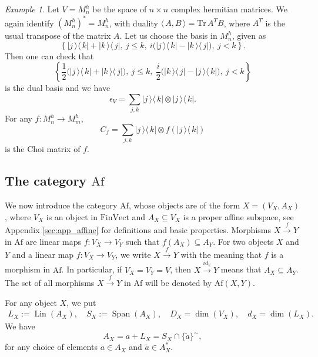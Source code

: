 \documentclass[12pt]{article}
\theoremstyle{definition}
\theoremstyle{remark}
\newtheorem{exm}{Example}
\def\lin{\operatorname{Lin}}
\def\Span{\operatorname{Span}}
\def \Tr{\mathrm{Tr}\,}
\def\<{\langle\,}
\def\>{\,\rangle}
\def \Af{\mathrm{Af}}
\def \FV{\mathrm{FinVect}}
\begin{document}
\begin{exm}\label{exm:quantum} Let $V=M_n^h$ be the space of $n\times n$ complex hermitian matrices. We again
identify $(M_n^h)^*=M_n^h$, with duality $\<A,B\>=\Tr A^TB$, where $A^T$ is the usual
transpose of the matrix $A$. Let us choose the basis in $M_n^h$, given as
\[
\left\{|j\>\<k|+|k\>\<j|,\ j\le k,\ i\biggl(|j\>\<k|-|k\>\<j|\biggr),\ j<k\right\}.
\]
Then one can check that
\[
\left\{\frac12\biggl(|j\>\<k|+|k\>\<j|\biggl),\ j\le k,\
\frac{i}{2}\biggl(|k\>\<j|-|j\>\<k|\biggr),\ j<k\right\}
\]
is the dual basis and we have
\[
\epsilon_V=\sum_{j,k} |j\>\<k|\otimes |j\>\<k|.
\]
For any $f:M_n^h\to M_m^h$, 
\[
C_f=\sum_{j,k} |j\>\<k|\otimes f(|j\>\<k|)
\]
is the Choi matrix of $f$.

\end{exm}





\subsection{The category $\Af$}

We now introduce the category $\Af$, whose objects  are of the form $X=(V_X,A_X)$, where
$V_X$ is an object in $\FV$  and $A_X\subseteq V_X$ is a proper affine subspace, see Appendix
\ref{sec:app_affine} for definitions and basic properties. Morphisms $X\xrightarrow{f} Y$ in $\Af$ are linear maps $f:V_X\to V_Y$  such that
$f(A_X)\subseteq A_Y$. For two objects $X$ and $Y$ and a  linear map $f:V_X\to V_Y$, we write $X\xrightarrow{f} Y$ with
the meaning that $f$ is a morphism in $\Af$. In particular, if $V_X=V_Y=V$, then  $X\xrightarrow{id_V} Y$ means
that  $A_X\subseteq A_Y$. The set of all morphisms $X\xrightarrow{f} Y$ in $\Af$ will be
denoted by $\Af(X,Y)$.


For any object $X$, we put
\begin{align*}
L_X:=\lin(A_X), \quad  S_X:=\Span(A_X), \quad D_X=\dim(V_X),\quad d_X=\dim(L_X).
\end{align*}
We have
\begin{equation}\label{eq:ALS}
A_X=a+L_X=S_X\cap \{\tilde a\}^{\sim},
\end{equation}
for any choice of elements $a\in A_X$ and $\tilde a\in A^*_X$.
\end{document}
